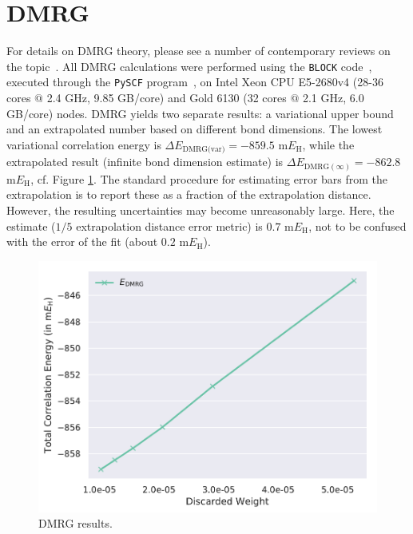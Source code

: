 \documentclass[journal=jcp,manuscript=suppinfo]{achemso}
\begin{document}
\section{DMRG}

For details on DMRG theory, please see a number of contemporary reviews on the topic~\cite{chan_dmrg_2011,wouters_dmrg_2014,knecht_dmrg_2016}. All DMRG calculations were performed using the {\texttt{BLOCK}} code~\cite{chan_head_gordon_dmrg_jcp_2002,chan_dmrg_jcp_2004,chan_polyacetylenes_jcp_2008,sharma_chan_dmrg_2012,chan_dmrg_2015}, executed through the {\texttt{PySCF}} program~\cite{pyscf_prog,pyscf_paper,pyscf_arxiv_2020}, on Intel Xeon CPU E5-2680v4 (28-36 cores $@$ 2.4 GHz, 9.85 GB/core) and Gold 6130 (32 cores $@$ 2.1 GHz, 6.0 GB/core) nodes. DMRG yields two separate results: a variational upper bound and an extrapolated number based on different bond dimensions. The lowest variational correlation energy is $\Delta E_{\text{DMRG(var)}} = -859.5$ m$E_{\text{H}}$, while the extrapolated result (infinite bond dimension estimate) is $\Delta E_{\text{DMRG}(\infty)} = -862.8$ m$E_{\text{H}}$, cf. Figure \ref{dmrg_SI_fig}. The standard procedure for estimating error bars from the extrapolation is to report these as a fraction of the extrapolation distance. However, the resulting uncertainties may become unreasonably large. Here, the estimate ($1/5$ extrapolation distance error metric) is $0.7$ m$E_{\text{H}}$, not to be confused with the error of the fit (about $0.2$ m$E_{\text{H}}$).
%
\begin{figure}[ht!]
\begin{center}
\includegraphics[scale=0.75]{figures/dmrg/dmrg.pdf}
\caption{DMRG results.}
\label{dmrg_SI_fig}
\end{center}
\end{figure}
%
\end{document}
